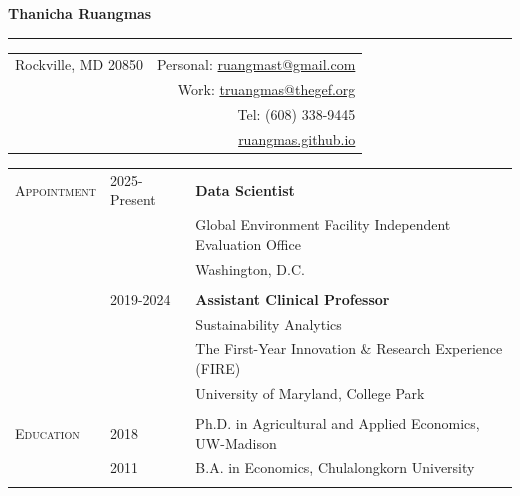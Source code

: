 \documentclass[letterpaper,11pt,oneside]{article}\usepackage[]{graphicx}\usepackage[]{xcolor}
\newcommand{\link}[1]{{\color{blue}\href{#1}{#1}}}
\begin{document}

\noindent  \LARGE{\textbf{Thanicha Ruangmas}}  \\
\noindent\rule{\textwidth}{1pt}
\normalsize 

\vspace{1em}
\noindent \begin{tabular}{p{2.1in} r}
Rockville, MD 20850            & \hspace{2.5in} Personal: \link{ruangmast@gmail.com} \\
                              & \hspace{2.5in} Work: \link{truangmas@thegef.org} \\
                              & \hspace{2.5in} Tel: (608) 338-9445 \\
                              & \hspace{2.5in} \link{ruangmas.github.io} \\
\end{tabular}

\vspace{2em}


\noindent \begin{tabular}{p{1.2in} p{0.9in} l}

\textsc{Appointment} & 2025-Present & \textbf{Data Scientist} \\
                    &               & Global Environment Facility Independent Evaluation Office\\
                    &               & Washington, D.C. \\
                    &               & \\

& 2019-2024 & \textbf{Assistant Clinical Professor} \\
                        &       & Sustainability Analytics \\
                        &       & The First-Year Innovation \& Research Experience (FIRE) \\
                        &       & University of Maryland, College Park \\
                        &       &  \\                        
\textsc{Education}      & 2018 & Ph.D. in Agricultural and Applied Economics, UW-Madison \\
                        & 2011 & B.A. in Economics, Chulalongkorn University \\
                        &       &  \\  
\end{tabular}
\end{document}
